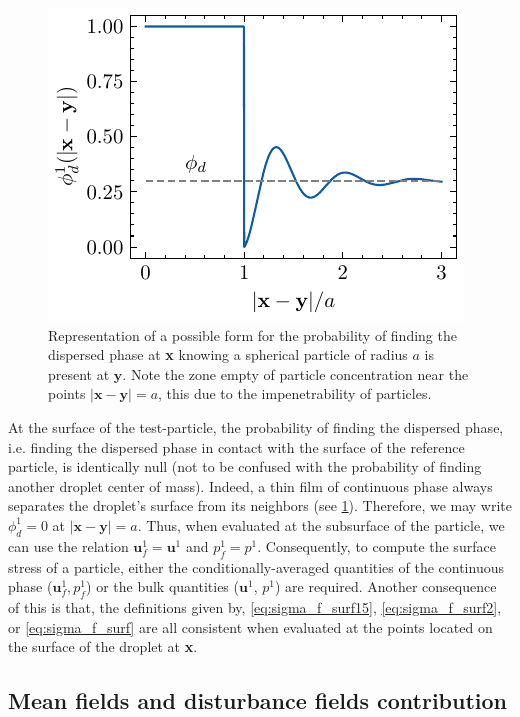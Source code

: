 \begin{figure}[h!]
    \centering
    \includegraphics[width=0.2\textheight]{image/dist_phi.pdf}
    \caption{Representation of a possible form for the probability of finding the dispersed phase at \textbf{x} knowing a spherical particle of radius $a$ is present at $\textbf{y}$.
    Note the zone empty of particle concentration near the points $|\textbf{x}- \textbf{y}|=a$, this due to the impenetrability of particles. 
    }
    \label{fig:distrib}
\end{figure}
At the surface of the test-particle, the probability of finding the dispersed phase, i.e. finding the dispersed phase in contact with the surface of the reference particle, is identically null (not to be confused with the probability of finding another droplet center of mass). 
Indeed, a thin film of continuous phase always separates the droplet's surface from its neighbors (see \ref{fig:distrib}).
Therefore, we may write $\phi_d^1 = 0$ at $|\textbf{x}- \textbf{y}| =a$. 
Thus, when evaluated at the subsurface of the particle, we can use the relation $\textbf{u}_f^1 = \textbf{u}^1$ and $p_f^1 = p^1$. 
Consequently, to compute the surface stress of a particle, either the conditionally-averaged quantities of the continuous phase ($\textbf{u}_f^1, p_f^1$) or the bulk quantities ($\textbf{u}^1$, $p^1$) are required. 
Another consequence of this is that, the definitions given by, \ref{eq:sigma_f_surf15}, \ref{eq:sigma_f_surf2}, or \ref{eq:sigma_f_surf} are all consistent when evaluated at the points located on the surface of the droplet at \textbf{x}. 

\subsection{Mean fields and disturbance fields contribution}

